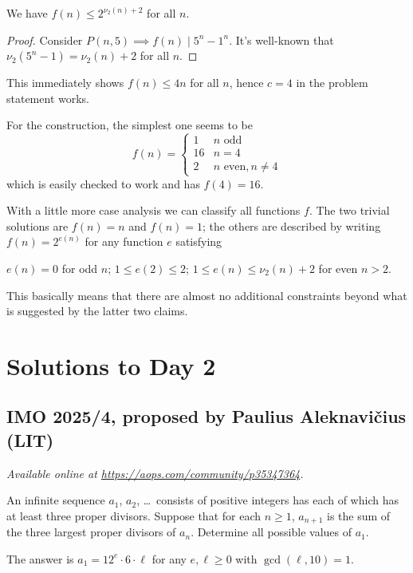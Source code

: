 \documentclass[11pt]{scrartcl}
\begin{document}
\begin{claim*}
  We have $f(n) \le 2^{\nu_2(n)+2}$ for all $n$.
\end{claim*}
\begin{proof}
  Consider $P(n,5) \implies f(n) \mid 5^n - 1^n$.
  It's well-known that $\nu_2(5^n-1) = \nu_2(n)+2$ for all $n$.
\end{proof}
This immediately shows $f(n) \le 4n$ for all $n$, hence $c=4$ in the problem statement works.

For the construction, the simplest one seems to be
\[
  f(n) = \begin{cases}
    1 & n \text{ odd} \\
    16 & n = 4 \\
    2 & n \text{ even}, n \neq 4
  \end{cases}
\]
which is easily checked to work and has $f(4) = 16$.

\begin{remark*}
  With a little more case analysis we can classify all functions $f$.
  The two trivial solutions are $f(n) = n$ and $f(n) = 1$;
  the others are described by writing $f(n) = 2^{e(n)}$ for any function $e$ satisfying
  \begin{itemize}
    \ii $e(n) = 0$ for odd $n$;
    \ii $1 \le e(2) \le 2$;
    \ii $1 \le e(n) \le \nu_2(n)+2$ for even $n > 2$.
  \end{itemize}
  This basically means that there are almost no additional constraints
  beyond what is suggested by the latter two claims.
\end{remark*}
\pagebreak

\section{Solutions to Day 2}
\subsection{IMO 2025/4, proposed by Paulius Aleknavičius (LIT)}
\textsl{Available online at \url{https://aops.com/community/p35347364}.}
\begin{mdframed}[style=mdpurplebox,frametitle={Problem statement}]
An infinite sequence $a_1$, $a_2$, \dots\ consists of positive integers
has each of which has at least three proper divisors.
Suppose that for each $n\geq 1$,
$a_{n+1}$ is the sum of the three largest proper divisors of $a_n$.
Determine all possible values of $a_1$.
\end{mdframed}
The answer is $a_1 = 12^e \cdot 6 \cdot \ell$
for any $e, \ell \ge 0$ with $\gcd(\ell, 10) = 1$.
\end{document}
